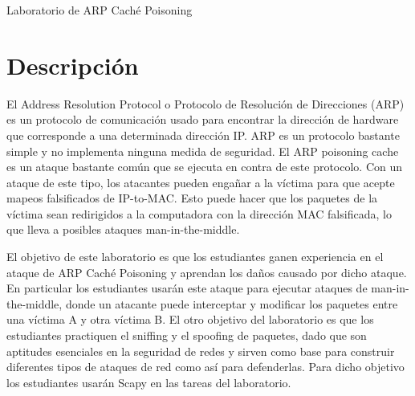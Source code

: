 
\newcommand{\commonfolder}{../../common-files}





\newcommand{\arpFigs}{./Figs}






\begin{center}
{\LARGE Laboratorio de ARP Caché Poisoning}
\end{center}



\section{Descripción}

El Address Resolution Protocol o Protocolo de Resolución de Direcciones (ARP) es un protocolo de comunicación usado para encontrar la dirección de hardware que corresponde a una determinada dirección IP. ARP es un protocolo bastante simple y no implementa ninguna medida de seguridad.
El ARP poisoning cache es un ataque bastante común que se ejecuta en contra de este protocolo.
Con un ataque de este tipo, los atacantes pueden engañar a la víctima para que acepte mapeos falsificados de IP-to-MAC. Esto puede hacer que los paquetes de la víctima sean redirigidos a la computadora con la dirección MAC falsificada, lo que lleva a posibles ataques man-in-the-middle.

El objetivo de este laboratorio es que los estudiantes ganen experiencia en el ataque de ARP Caché Poisoning y aprendan los daños causado por dicho ataque.
En particular los estudiantes usarán este ataque para ejecutar ataques de man-in-the-middle, donde un atacante puede interceptar y modificar los paquetes entre una víctima A y otra víctima B.
El otro objetivo del laboratorio es que los estudiantes practiquen el sniffing y el spoofing de paquetes, dado que son aptitudes esenciales en la seguridad de redes y sirven como base para construir diferentes tipos de ataques de red como así para defenderlas.
Para dicho objetivo los estudiantes usarán Scapy en las tareas del laboratorio.

